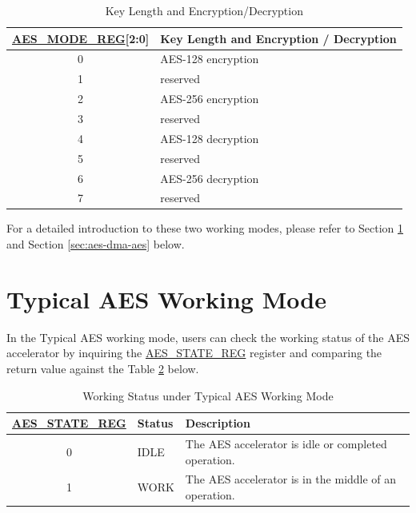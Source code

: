 \documentclass[main\_\_EN.tex]{subfiles}
\begin{document}
\begin{longtable}[c]{ | c | l | }
\caption{Key Length and Encryption/Decryption}
\label{tab:aes-operation}
\\\hline
\rowcolor{lightgray}
\textbf{\hyperref[regdesc:AESMODEREG]{AES\_MODE\_REG}[2:0] }    & \textbf{Key Length and Encryption / Decryption}\\
    \hline
    0                   & AES-128 encryption    \\
    \hline
    1                   & reserved    \\
    \hline
    2                   & AES-256 encryption    \\
    \hline
    3                   & reserved    \\
    \hline
    4                   & AES-128 decryption    \\
    \hline
    5                   & reserved    \\
    \hline
    6                   & AES-256 decryption    \\
    \hline
    7                   & reserved    \\
    \hline
\end{longtable}

For a detailed introduction to these two working modes, please refer to Section \ref{sec:aes-typical-modes} and Section \ref{sec:aes-dma-aes} below.


\section{Typical AES Working Mode}\label{sec:aes-typical-modes}

In the Typical AES working mode,
users can check the working status of the AES accelerator by inquiring the \hyperref[regdesc:AESSTATEREG]{AES\_STATE\_REG} register and comparing the return value against the Table \ref{tab:aes-state-value-typical} below.

\begin{longtable}[c]{ | c | l | l| }
\caption{Working Status under Typical AES Working Mode}
\label{tab:aes-state-value-typical}
\\\hline
\rowcolor{lightgray}
\textbf{\hyperref[regdesc:AESSTATEREG]{AES\_STATE\_REG}} & \textbf{Status} &  \textbf{Description} \\ \hline

    0                   & IDLE      &   The AES accelerator is idle or completed operation.\\ \hline
    1                   & WORK      &   The AES accelerator is in the middle of an operation.     \\ \hline
\end{longtable}
\end{document}
